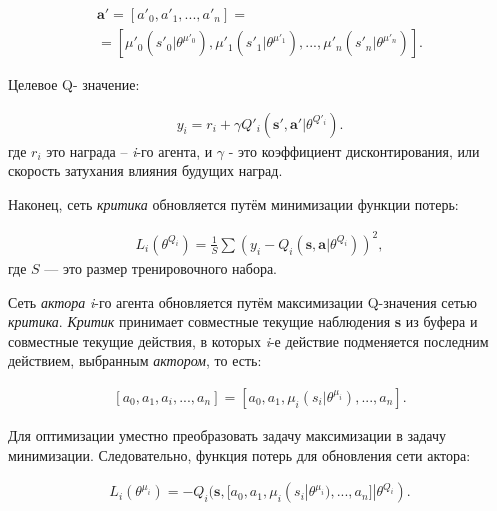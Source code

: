 \begin{equation}
    \begin{multlined}
        \mathbf{a'} = [a'_0, a'_1, ..., a'_n] = \\
        = [\mu'_0(s'_0|\theta^{\mu'_0}), \mu'_1(s'_1|\theta^{\mu'_1}), ..., \mu'_n(s'_n|\theta^{\mu'_n})].
    \end{multlined}
\end{equation}

Целевое Q- значение:

\begin{equation}
    \begin{multlined}
        y_i = r_i + \gamma Q'_i(\mathbf{s', a'}|\theta^{Q'_i}).
    \end{multlined}
\end{equation}
где $r_i$ это награда – \textit{i}-го агента, и $\gamma$ - это коэффициент дисконтирования, или скорость затухания влияния будущих наград.

Наконец, сеть \textit{критика} обновляется путём минимизации функции потерь:

\begin{equation}
    \begin{multlined}
        L_i(\theta^{Q_i}) = \frac{1}{S} \sum (y_i - Q_i(\mathbf{s, a}|\theta^{Q_i}))^2,
    \end{multlined}
\end{equation}
где $S$ --- это размер тренировочного набора.

Сеть \textit{актора} \textit{i}-го агента обновляется путём максимизации Q-значения сетью \textit{критика}. \textit{Критик} принимает совместные текущие наблюдения \textbf{s} из буфера и совместные текущие действия, в которых \textit{i}-е действие подменяется последним действием, выбранным \textit{актором}, то есть:

\begin{equation}
    \begin{multlined}
    [a_0, a_1, a_i, ..., a_n]
        = [a_0, a_1, \mu_i(s_i|\theta^{\mu_i}), ..., a_n].
    \end{multlined}
\end{equation}

Для оптимизации уместно преобразовать задачу максимизации в задачу минимизации. Следовательно, функция потерь для обновления сети актора:

\begin{equation}
    \begin{multlined}
        L_i(\theta^{\mu_i}) = -Q_i(\mathbf{s}, [a_0, a_1, \mu_i(s_i|\theta^{\mu_i}), ..., a_n]|\theta^{Q_i}).
    \end{multlined}
\end{equation}

